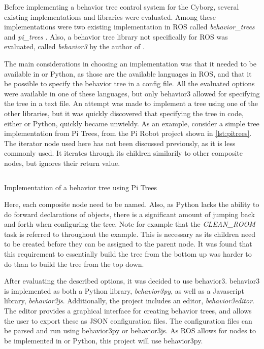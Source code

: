 \documentclass[\rootfolder/main.tex]{subfiles}
\begin{document}
Before implementing a behavior tree control system for the Cyborg, several existing implementations and libraries were evaluated.
Among these implementations were two existing implementation in ROS called \emph{behavior\_trees} \cite{Colledanchise} and \emph{pi\_trees} \cite{Goebel}.
Also, a behavior tree library not specifically for ROS was evaluated, called \emph{behavior3} by the author of \cite{Pereira2015}.

The main considerations in choosing an implementation was that it needed to be available in \CC or Python, as those are the available languages in ROS, and that it be possible to specify the behavior tree in a config file.
All the evaluated options were available in one of these languages, but only behavior3 allowed for specifying the tree in a text file.
An attempt was made to implement a tree using one of the other libraries, but it was quickly discovered that specifying the tree in code, either \CC or Python, quickly became unwieldy.
As an example, consider a simple tree implementation from Pi Trees, from the Pi Robot project \cite{PiRobot} shown in \cref{lst:pitrees}.
The iterator node used here has not been discussed previously, as it is less commonly used.
It iterates through its children similarily to other composite nodes, but ignores their return value.

\begin{listing}
    \inputminted[fontsize=\scriptsize]{Python}{\rootfolder/Chapters/Chapter3/Listings/pitrees}
    \caption{Implementation of a behavior tree using Pi Trees}
    \label{lst:pitrees}
\end{listing}

Here, each composite node need to be named.
Also, as Python lacks the ability to do forward declarations of objects, there is a significant amount of jumping back and forth when configuring the tree.
Note for example that the \emph{CLEAN\_ROOM} task is referred to throughout the example.
This is necessary as its children need to be created before they can be assigned to the parent node.
It was found that this requirement to essentially build the tree from the bottom up was harder to do than to build the tree from the top down.

After evaluating the described options, it was decided to use behavior3.
behavior3 is implemented as both a Python library, \emph{behavior3py}, as well as a Javascript library, \emph{behavior3js}.
Additionally, the project includes an editor, \emph{behavior3editor}.
The editor provides a graphical interface for creating behavior trees, and allows the user to export these as JSON configuration files.
The configuration files can be parsed and run using behavior3py or behavior3js.
As ROS allows for nodes to be implemented in \CC or Python, this project will use behavior3py.
\end{document}
